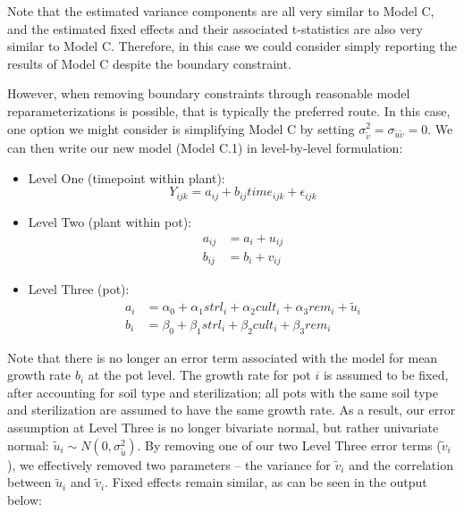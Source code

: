 \documentclass[
]{krantz}
\providecommand{\tightlist}{%
  \setlength{\itemsep}{0pt}\setlength{\parskip}{0pt}}
\begin{document}
Note that the estimated variance components are all very similar to Model C, and the estimated fixed effects and their associated t-statistics are also very similar to Model C. Therefore, in this case we could consider simply reporting the results of Model C despite the boundary constraint.

However, when removing boundary constraints through reasonable model reparameterizations is possible, that is typically the preferred route. In this case, one option we might consider is simplifying Model C by setting \(\sigma_{\tilde{v}}^{2}=\sigma_{\tilde{u}\tilde{v}}=0\). We can then write our new model (Model C.1) in level-by-level formulation:

\begin{itemize}
\tightlist
\item
  Level One (timepoint within plant):
  \begin{equation}
  Y_{ijk} = a_{ij}+b_{ij}\textstyle{time}_{ijk}+\epsilon_{ijk}
  \end{equation}
\item
  Level Two (plant within pot):
  \begin{align*}
  a_{ij} & = a_{i}+u_{ij} \\
  b_{ij} & = b_{i}+v_{ij}
  \end{align*}
\item
  Level Three (pot):
  \begin{align*}
  a_{i} & = \alpha_{0}+\alpha_{1}\textstyle{strl}_{i}+\alpha_{2}\textstyle{cult}_{i}+\alpha_{3}\textstyle{rem}_{i}+\tilde{u}_{i} \\
  b_{i} & = \beta_{0}+\beta_{1}\textstyle{strl}_{i}+\beta_{2}\textstyle{cult}_{i}+\beta_{3}\textstyle{rem}_{i}
  \end{align*}
\end{itemize}

Note that there is no longer an error term associated with the model for mean growth rate \(b_{i}\) at the pot level. The growth rate for pot \(i\) is assumed to be fixed, after accounting for soil type and sterilization; all pots with the same soil type and sterilization are assumed to have the same growth rate. As a result, our error assumption at Level Three is no longer bivariate normal, but rather univariate normal: \(\tilde{u}_{i}\sim N(0,\sigma_{\tilde{u}}^{2})\). By removing one of our two Level Three error terms (\(\tilde{v}_{i}\)), we effectively removed two parameters -- the variance for \(\tilde{v}_{i}\) and the correlation between \(\tilde{u}_{i}\) and \(\tilde{v}_{i}\). Fixed effects remain similar, as can be seen in the output below:
\end{document}
